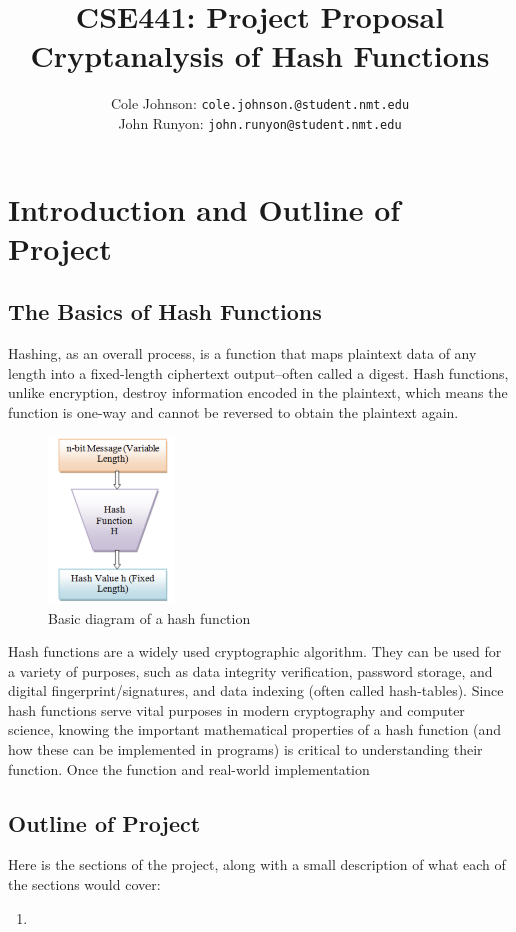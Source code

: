 \documentclass[12pt,english]{article}
\author{
    Cole Johnson: \texttt{cole.johnson.@student.nmt.edu}
    \\ 
    John Runyon: \texttt{john.runyon@student.nmt.edu}
}
\title{
    CSE441: Project Proposal\\
    \large{Cryptanalysis of Hash Functions}
}
\begin{document}
\maketitle
\section*{Introduction and Outline of Project}
\subsection{The Basics of Hash Functions}
Hashing, as an overall process, is a function that maps
plaintext data of any length into a fixed-length ciphertext
output--often called a digest. Hash functions, unlike encryption,
destroy information encoded in the plaintext, which means
the function is one-way and cannot be reversed to obtain
the plaintext again.

\begin{figure}
    \begin{center}
      \includegraphics[width=0.3\textwidth]{images/hash_function.png}
    \end{center}
    \caption{Basic diagram of a hash function}
  \end{figure}

Hash functions are a widely used cryptographic algorithm.
They can be used for a variety of purposes, such as
data integrity verification, password storage, and digital
fingerprint/signatures, and data indexing (often called hash-tables).
Since hash functions serve vital purposes in modern cryptography
and computer science, knowing the important mathematical properties
of a hash function (and how these can be implemented in programs)
is critical to understanding their function. Once the function and
real-world implementation

\subsection{Outline of Project}
Here is the sections of the project, along 
with a small description of what each of the
sections would cover:
\begin{enumerate}[{\bf a.}]
    \item 
\end{enumerate}
\end{document}
